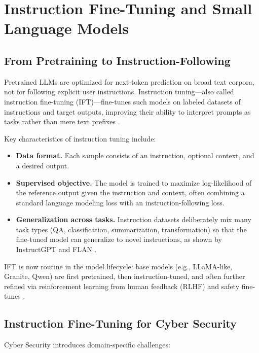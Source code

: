 \documentclass[unnumsec,webpdf,contemporary,large]{oup-authoring-template}
\theoremstyle{thmstyleone}
\theoremstyle{thmstyletwo}
\theoremstyle{thmstylethree}
\begin{document}
\section{Instruction Fine-Tuning and Small Language Models}
\label{sec:ift-slm}

\subsection{From Pretraining to Instruction-Following}

Pretrained LLMs are optimized for next-token prediction on broad text corpora, not for following explicit user instructions. Instruction tuning---also called instruction fine-tuning (IFT)---fine-tunes such models on labeled datasets of instructions and target outputs, improving their ability to interpret prompts as tasks rather than mere text prefixes \cite{wei2022flan,ouyang2022instructgpt}.

Key characteristics of instruction tuning include:

\begin{itemize}
  \item \textbf{Data format.} Each sample consists of an instruction, optional context, and a desired output.
  \item \textbf{Supervised objective.} The model is trained to maximize log-likelihood of the reference output given the instruction and context, often combining a standard language modeling loss with an instruction-following loss.
  \item \textbf{Generalization across tasks.} Instruction datasets deliberately mix many task types (QA, classification, summarization, transformation) so that the fine-tuned model can generalize to novel instructions, as shown by InstructGPT and FLAN \cite{wei2022flan,ouyang2022instructgpt}.
\end{itemize}

IFT is now routine in the model lifecycle: base models (e.g., LLaMA-like, Granite, Qwen) are first pretrained, then instruction-tuned, and often further refined via reinforcement learning from human feedback (RLHF) and safety fine-tunes \cite{ouyang2022instructgpt}.

\subsection{Instruction Fine-Tuning for Cyber Security}

Cyber Security introduces domain-specific challenges:
\end{document}
